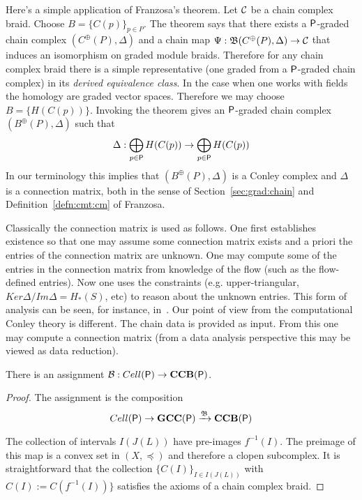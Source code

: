 Here's a simple application of Franzosa's theorem.  Let ${\mathcal C}$ be a chain complex braid.  Choose $B = \{C(p)\}_{p\in P}$.  The theorem says that there exists a ${\mathsf P}$-graded chain complex  $(C^\oplus(P),\Delta)$ and a chain map  $\Psi:\mathfrak{B}(C^\oplus(P),\Delta)\to {\mathcal C}$ that induces an isomorphism on graded module braids.  Therefore for any chain complex braid there is a simple representative (one graded from a ${\mathsf P}$-graded chain complex) in its {\em derived equivalence class}.  In the case when one works with fields the homology are graded vector spaces.  Therefore we may choose $B=\{H(C(p))\}$.  Invoking the theorem gives an ${\mathsf P}$-graded chain complex $(B^\oplus(P),\Delta)$ such that 
\[
\Delta:\bigoplus_{p\in {\mathsf P}} H(C(p))\to \bigoplus_{p\in {\mathsf P}} H(C(p))
\] 
 In our terminology this implies that $(B^\oplus(P),\Delta)$ is a Conley complex and $\Delta$ is a connection matrix, both in the sense of Section~\ref{sec:grad:chain} and Definition~\ref{defn:cmt:cm} of Franzosa.

\begin{rem}
Classically the connection matrix is used as follows.  One first establishes existence so that one may assume some connection matrix exists and a priori the entries of the connection matrix are unknown.  One may compute some of the entries in the connection matrix from knowledge of the flow (such as the flow-defined entries).  Now one uses the constraints (e.g. upper-triangular, $Ker\Delta/Im\Delta = H_*(S)$, etc) to reason about the unknown entries.  This form of analysis can be seen, for instance, in~\cite{}.  Our point of view from the computational Conley theory is different.  The chain data is provided as input.  From this one may compute a connection matrix (from a data analysis perspective this may be viewed as data reduction). 
\end{rem}


\begin{prop}
There is an assignment ${\mathcal B}:Cell({\mathsf P})\to {\bf CCB}({\mathsf P})$.
\end{prop}
\begin{proof}

The assignment is the composition $$Cell({\mathsf P})\to {\bf GCC({\mathsf P})} \xrightarrow{\mathfrak{B}} {\bf CCB}({\mathsf P})$$


The collection of intervals $I(J(L))$ have pre-images $f^{-1}(I)$.  The preimage of this map is a convex set in $(X,\preceq)$ and therefore a clopen subcomplex.   It is straightforward that the collection $\{C(I)\}_{I\in I(J(L))}$ with $C(I) := C(f^{-1}(I))\}$ satisfies the axioms of a chain complex braid. 
\end{proof}





